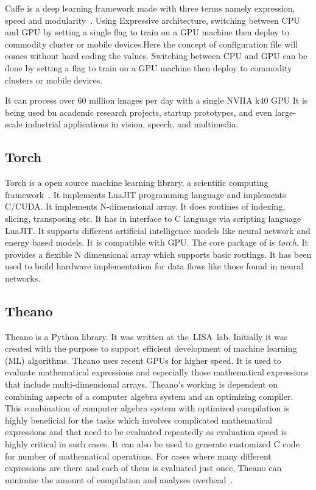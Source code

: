 Caffe is a deep learning framework made with three terms namely
expression, speed and modularity~\cite{www-caffe}. Using Expressive
architecture, switching between CPU and GPU by setting a single flag
to train on a GPU machine then deploy to commodity cluster or mobile
devices.Here the concept of configuration file will comes without hard
coding the values. Switching between CPU and GPU can be done by
setting a flag to train on a GPU machine then deploy to commodity
clusters or mobile devices.

    It can process over 60 million images per day with a single NVIIA
    k40 GPU It is being used bu academic research projects, startup
    prototypes, and even large-scale industrial applications in
    vision, speech, and multimedia.
    
\subsection{Torch}

Torch is a open source machine learning library, a scientific
computing framework~\cite{www-torch}. It implements LuaJIT programming
language and implements C/CUDA. It implements N-dimensional array. It
does routines of indexing, slicing, transposing etc. It has in
interface to C language via scripting language LuaJIT. It supports
different artificial intelligence models like neural network and
energy based models. It is compatible with GPU.  The core package of
is \textit{torch}. It provides a flexible N dimensional array which
supports basic routings. It has been used to build hardware
implementation for data flows like those found in neural networks.
    
    
\subsection{Theano}
    
Theano is a Python library. It was written at the LISA lab.  Initially
it was created with the purpose to support efficient development of
machine learning (ML) algorithms.  Theano uses recent GPUs for higher
speed.  It is used to evaluate mathematical expressions and especially
those mathematical expressions that include multi-dimensional arrays.
Theano’s working is dependent on combining aspects of a computer
algebra system and an optimizing compiler.  This combination of
computer algebra system with optimized compilation is highly
beneficial for the tasks which involves complicated mathematical
expressions and that need to be evaluated repeatedly as evaluation
speed is highly critical in such cases.  It can also be used to
generate customized C code for number of mathematical operations.  For
cases where many different expressions are there and each of them is
evaluated just once, Theano can minimize the amount of compilation and
analyses overhead~\cite{www-theano}.
    
